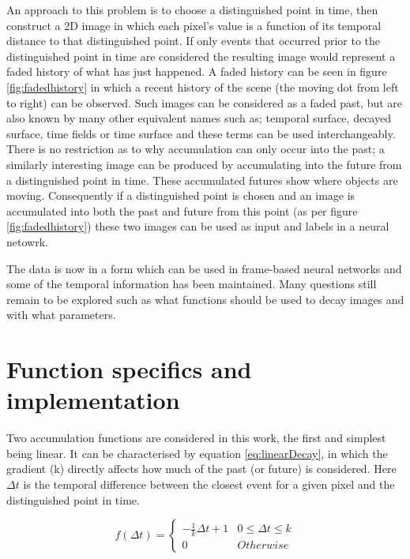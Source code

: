 An approach to this problem is to choose a distinguished point in time, then construct a 2D image in which each pixel's value is a function of its temporal distance to that distinguished point.
If only events that occurred prior to the distinguished point in time are considered the resulting image would represent a faded history of what has just happened. 
A faded history can be seen in figure \ref{fig:fadedhistory} in which a recent history of the scene (the moving dot from left to right) can be observed. 
Such images can be considered as a faded past, but are also known by many other equivalent names such as; temporal surface, decayed surface, time fields or time surface and these terms can be used interchangeably. 
There is no restriction as to why accumulation can only occur into the past; a similarly interesting image can be produced by accumulating into the future from a distinguished point in time.
These accumulated futures show where objects are moving. 
Consequently if a distinguished point is chosen and an image is accumulated into both the past and future from this point (as per figure \ref{fig:fadedhistory}) these two images can be used as input and labels in a neural netowrk. 


The data is now in a form which can be used in frame-based neural networks and some of the temporal information has been maintained.
Many questions still remain to be explored such as what functions should be used to decay images and with what parameters.


\section{Function specifics and implementation}

Two accumulation functions are considered in this work, the first and simplest being linear. 
It can be characterised by equation \ref{eq:linearDecay}, in which the gradient (k) directly affects how much of the past (or future) is considered. 
Here $\Delta t$ is the temporal difference between the closest event for a given pixel and the distinguished point in time. 


\begin{equation}
 \label{eq:linearDecay}
    f(\Delta t) = 
    \begin{cases}
    -\frac{1}{k}  \Delta t + 1 & 0\leq \Delta t \leq k \\
    0 & Otherwise
   \end{cases}
\end{equation}


